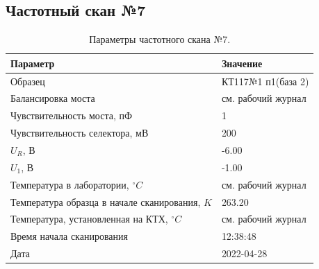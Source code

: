 \subsection{Частотный скан №7}
\begin{table}[!ht]
    \centering
    \caption{Параметры частотного скана №7.}
    \begin{tabular}{|l|l|}
        \hline
        Параметр                                       & Значение                  \\ \hline
        Образец                                        & КТ117№1 п1(база 2)        \\ \hline
        Балансировка моста                             & см. рабочий журнал        \\ \hline
        Чувствительность моста, пФ                     & 1                         \\ \hline
        Чувствительность селектора, мВ                 & 200                       \\ \hline
        $U_R$, В                                       & -6.00                     \\ \hline
        $U_1$, В                                       & -1.00                     \\ \hline
        Температура в лаборатории, $^\circ C$          & см. рабочий журнал        \\ \hline
        Температура образца в начале сканирования, $K$ & 263.20                    \\ \hline
        Температура, установленная на КТХ, $^\circ C$  & см. рабочий журнал        \\ \hline
        Время начала сканирования                      & 12:38:48                  \\ \hline
        Дата                                           & 2022-04-28                \\ \hline
    \end{tabular}
    \label{table:frequency_scan_7}
\end{table}

